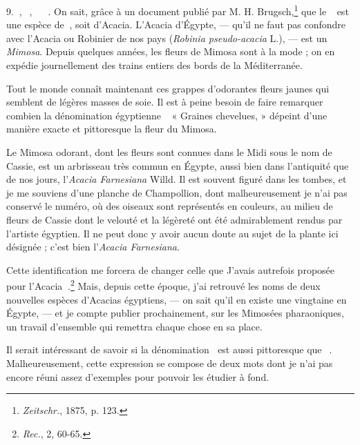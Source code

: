 \documentclass[a4paper, 11pt, oneside]{article}
\newcommand*\hieroAAAR{}
\newcommand*\hieroAABV{}
\newcommand*\hieroAAHH{}
\newcommand*\hieroAAKY{}
\newcommand*\hieroAALE{}
\newcommand*\hieroAAWP{}
\newcommand*\hieroAAWZ{}
\newcommand*\hieroAAXB{}
\newcommand*\hieroAAXC{}
\newcommand*\hieroAAXD{}
\newcommand*\hieroAAXE{}
\newcommand*\hieroAAXF{}
\newcommand*\hieroAAXG{}
\begin{document}
9. $\hieroAAKY\:\hieroAAXB$, $\hieroAALE\:\hieroAAXC\:\hieroAAXD$, $\hieroAAKY\:\hieroAAXE\:\hieroAAXB\:\hieroAAHH\:\hieroAAWP\:\hieroAAAR\:\hieroAAXF$. On sait, grâce à un document publié par M. H. Brugsch,\footnote{\emph{Zeitschr.}, 1875, p. 123.} que le $\hieroAAWP\:\hieroAAAR\:\hieroAAXF$ est une espèce de $\hieroAAWZ\:\hieroAABV$, soit d'Acacia. L'Acacia d'Égypte, --- qu'il ne faut pas confondre avec l'Acacia ou Robinier de nos pays (\emph{Robinia pseudo-acacia} L.), --- est un \emph{Mimosa}. Depuis quelques années, les fleurs de Mimosa sont à la mode ; on en expédie journellement des trains entiers des bords de la Méditerranée.

Tout le monde connaît maintenant ces grappes d'odorantes fleurs jaunes qui semblent de légères masses de soie. Il est à peine besoin de faire remarquer combien la dénomination égyptienne $\hieroAAWP\:\hieroAAAR\:\hieroAAXF$ « Graines chevelues, » dépeint d'une manière exacte et pittoresque la fleur du Mimosa.

Le Mimosa odorant, dont les fleurs sont connues dans le Midi sous le nom de Cassie, est un arbrisseau très commun en Égypte, aussi bien dans l'antiquité que de nos jours, l'\emph{Acacia Farnesiana} Willd. Il est souvent figuré dans les tombes, et je me souviens d'une planche de Champollion, dont malheureusement je n'ai pas conservé le numéro, où des oiseaux sont représentés en couleurs, au milieu de fleurs de Cassie dont le velouté et la légèreté ont été admirablement rendus par l'artiste égyptien. Il ne peut donc y avoir aucun doute au sujet de la plante ici désignée ; c'est bien l'\emph{Acacia Farnesiana}.

Cette identification me forcera de changer celle que J'avais autrefois proposée pour l'Acacia $\hieroAAXG\:\hieroAABV$.\footnote{\emph{Rec.}, 2, 60-65.} Mais, depuis cette époque, j'ai retrouvé les noms de deux nouvelles espèces d'Acacias égyptiens, --- on sait qu'il en existe une vingtaine en Égypte, --- et je compte publier prochainement, sur les Mimosées pharaoniques, un travail d'ensemble qui remettra chaque chose en sa place.

Il serait intéressant de savoir si la dénomination $\hieroAAKY\:\hieroAAXB$ est aussi pittoresque que $\hieroAAWP\:\hieroAAAR\:\hieroAAXF$. Malheureusement, cette expression se compose de deux mots dont je n'ai pas encore réuni assez d'exemples pour pouvoir les étudier à fond.
\end{document}
